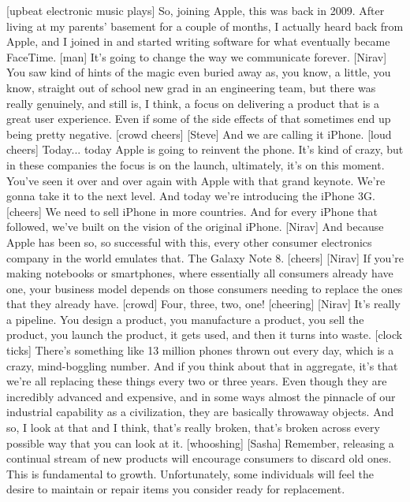 \documentclass[a4paper]{article}
\begin{document}
	[upbeat electronic music plays]
	So, joining Apple, this was back in 2009.
	After living at my parents' basement for a couple of months,
	I actually heard back from Apple,
	and I joined in and started writing software
	for what eventually became FaceTime.
	[man] It's going to change the way we communicate forever.
	[Nirav] You saw kind of hints of the magic even buried away as, you know, a little,
	you know, straight out of school new grad in an engineering team,
	but there was really genuinely, and still is, I think,
	a focus on delivering a product that is a great user experience.
	Even if some of the side effects of that sometimes end up being pretty negative.
	[crowd cheers]
	[Steve] And we are calling it iPhone.
	[loud cheers]
	Today...
	today Apple is going to reinvent the phone.
	It's kind of crazy, but in these companies
	the focus is on the launch, ultimately, it's on this moment.
	You've seen it over and over again with Apple with that grand keynote.
	We're gonna take it to the next level.
	And today we're introducing the iPhone 3G.
	[cheers]
	We need to sell iPhone in more countries.
	And for every iPhone that followed,
	we've built on the vision of the original iPhone.
	[Nirav] And because Apple has been
	so, so successful with this,
	every other consumer electronics company in the world
	emulates that.
	The Galaxy Note 8.
	[cheers]
	[Nirav] If you're making notebooks or smartphones,
	where essentially all consumers already have one,
	your business model depends on
	those consumers needing to replace the ones that they already have.
	[crowd] Four, three, two, one!
	[cheering]
	[Nirav] It's really a pipeline. You design a product,
	you manufacture a product, you sell the product,
	you launch the product,
	it gets used,
	and then it turns into waste.
	[clock ticks]
	There's something like
	13 million phones thrown out every day, which is a crazy, mind-boggling number.
	And if you think about that in aggregate,
	it's that we're all replacing these things every two or three years.
	Even though they are incredibly advanced and expensive,
	and in some ways almost the pinnacle of
	our industrial capability as a civilization,
	they are basically throwaway objects.
	And so, I look at that and I think,
	that's really broken, that's broken across every possible way
	that you can look at it.
	[whooshing]
	[Sasha] Remember,
	releasing a continual stream of new products will encourage consumers
	to discard old ones.
	This is fundamental to growth.
	Unfortunately, some individuals will feel the desire to maintain
	or repair items you consider ready for replacement.
\end{document}

